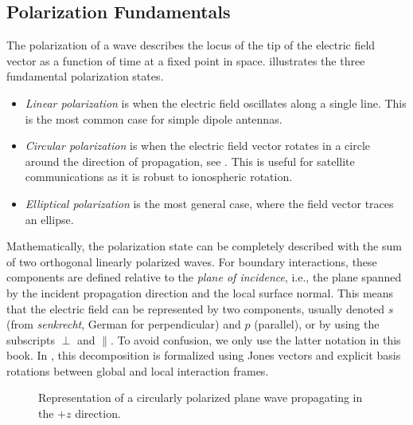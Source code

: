 \subsection{Polarization Fundamentals}

The polarization of a wave describes the locus of the tip of the electric field vector as a function of time at a fixed point in space.  illustrates the three fundamental polarization states.
\begin{itemize}
  \item \emph{Linear polarization} is when the electric field oscillates along a single line. This is the most common case for simple dipole antennas.
  \item \emph{Circular polarization} is when the electric field vector rotates in a circle around the direction of propagation, see . This is useful for satellite communications as it is robust to ionospheric rotation.
  \item \emph{Elliptical polarization} is the most general case, where the field vector traces an ellipse.
\end{itemize}

\begin{marginfigure}[-4cm]
  \centering
  \caption{Possible polarization states for a plane wave propagating in the $+z$ direction.}
\end{marginfigure}

Mathematically, the polarization state can be completely described with the sum of two orthogonal linearly polarized waves. For boundary interactions, these components are defined relative to the \emph{plane of incidence}, i.e., the plane spanned by the incident propagation direction and the local surface normal. This means that the electric field can be represented by two components, usually denoted $s$ (from \emph{senkrecht}, German for perpendicular) and $p$ (parallel), or by using the subscripts $\perp$ and $\parallel$. To avoid confusion, we only use the latter notation in this book. In , this decomposition is formalized using Jones vectors and explicit basis rotations between global and local interaction frames.

\begin{figure}
  \centering
  \caption{Representation of a circularly polarized plane wave propagating in the $+z$ direction.}
\end{figure}

